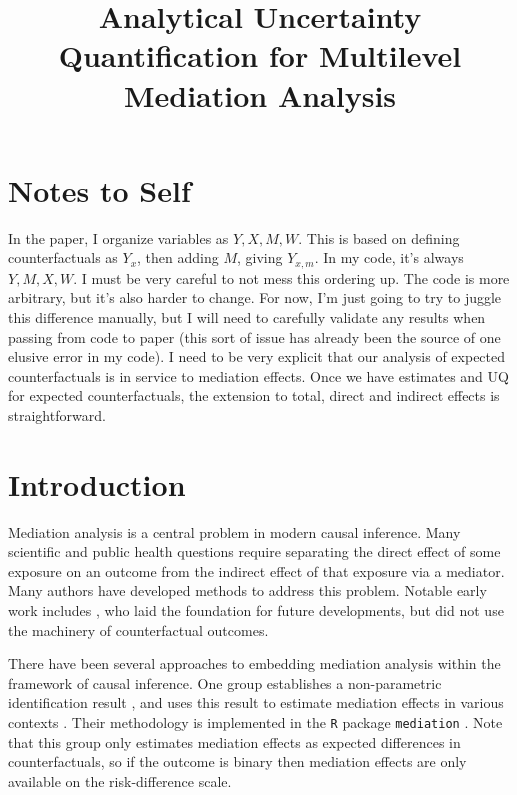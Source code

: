 \documentclass{article}
\title{Analytical Uncertainty Quantification for Multilevel Mediation Analysis}
\begin{document}
\maketitle
\section{Notes to Self}
\begin{outline}
    \1 In the paper, I organize variables as $Y, X, M, W$. This is based on defining counterfactuals as $Y_x$, then adding $M$, giving $Y_{x, m}$. In my code, it's always $Y, M, X, W$. I must be very careful to not mess this ordering up. The code is more arbitrary, but it's also harder to change. For now, I'm just going to try to juggle this difference manually, but I will need to carefully validate any results when passing from code to paper (this sort of issue has already been the source of one elusive error in my code).
    \1 I need to be very explicit that our analysis of expected counterfactuals is in service to mediation effects. Once we have estimates and UQ for expected counterfactuals, the extension to total, direct and indirect effects is straightforward.
\end{outline}



\section{Introduction}

Mediation analysis is a central problem in modern causal inference. Many scientific and public health questions require separating the direct effect of some exposure on an outcome from the indirect effect of that exposure via a mediator. Many authors have developed methods to address this problem. Notable early work includes \citet{Bar86}, who laid the foundation for future developments, but did not use the machinery of counterfactual outcomes. 

There have been several approaches to embedding mediation analysis within the framework of causal inference. One group establishes a non-parametric identification result \citep{Ima10II}, and uses this result to estimate mediation effects in various contexts \citep{Ima10I, Ima11}. Their methodology is implemented in the \texttt{R} package \texttt{mediation} \citep{Tin14}. Note that this group only estimates mediation effects as expected differences in counterfactuals, so if the outcome is binary then mediation effects are only available on the risk-difference scale.
\end{document}
